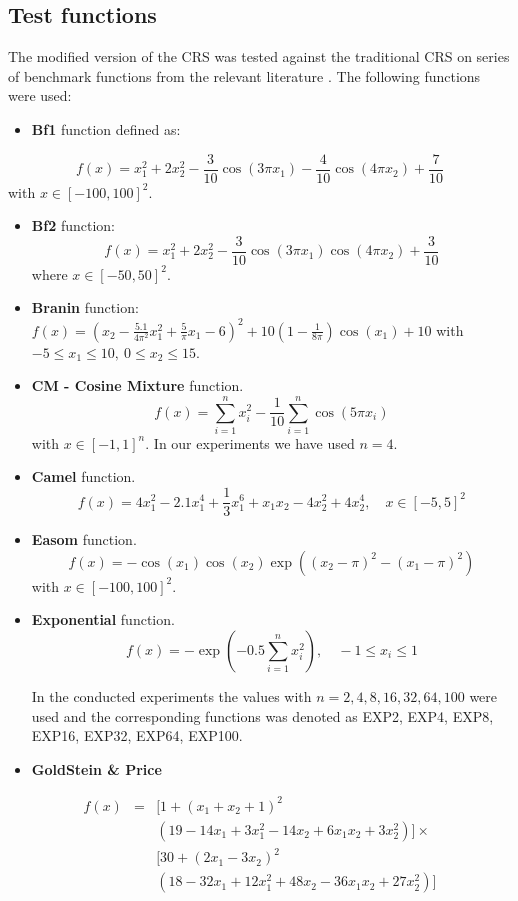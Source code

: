 \documentclass[symmetry,article,submit,moreauthors,pdftex]{mdpi}
\begin{document}
\subsection{Test functions }

The modified version of the CRS was tested against the traditional
CRS on series of benchmark functions from the relevant literature
\cite{Ali1,Floudas1}. The following functions were used: 
\begin{itemize}
\item \textbf{Bf1} function defined as:

\end{itemize}
\[
f(x)=x_{1}^{2}+2x_{2}^{2}-\frac{3}{10}\cos\left(3\pi x_{1}\right)-\frac{4}{10}\cos\left(4\pi x_{2}\right)+\frac{7}{10}
\]
with $x\in[-100,100]^{2}$. 
\begin{itemize}
\item \textbf{Bf2} function:
\[
f(x)=x_{1}^{2}+2x_{2}^{2}-\frac{3}{10}\cos\left(3\pi x_{1}\right)\cos\left(4\pi x_{2}\right)+\frac{3}{10}
\]
where $x\in[-50,50]^{2}$. 
\item \textbf{Branin} function:
$f(x)=\left(x_{2}-\frac{5.1}{4\pi^{2}}x_{1}^{2}+\frac{5}{\pi}x_{1}-6\right)^{2}+10\left(1-\frac{1}{8\pi}\right)\cos(x_{1})+10$
with $-5\le x_{1}\le10,\ 0\le x_{2}\le15$.
\item \textbf{CM - Cosine Mixture} function. 
\[
f(x)=\sum_{i=1}^{n}x_{i}^{2}-\frac{1}{10}\sum_{i=1}^{n}\cos\left(5\pi x_{i}\right)
\]
with $x\in[-1,1]^{n}$. In our experiments we have used $n=4$.
\item \textbf{Camel} function. 
\[
f(x)=4x_{1}^{2}-2.1x_{1}^{4}+\frac{1}{3}x_{1}^{6}+x_{1}x_{2}-4x_{2}^{2}+4x_{2}^{4},\quad x\in[-5,5]^{2}
\]
\item \textbf{Easom} function. 
\[
f(x)=-\cos\left(x_{1}\right)\cos\left(x_{2}\right)\exp\left(\left(x_{2}-\pi\right)^{2}-\left(x_{1}-\pi\right)^{2}\right)
\]
with $x\in[-100,100]^{2}.$ 
\item \textbf{Exponential} function. 
\[
f(x)=-\exp\left(-0.5\sum_{i=1}^{n}x_{i}^{2}\right),\quad-1\le x_{i}\le1
\]

In the conducted experiments the values with $n=2,4,8,16,32,64,100$ were used and the corresponding functions was denoted as EXP2, EXP4,
EXP8, EXP16, EXP32, EXP64, EXP100.
\item \textbf{GoldStein \& Price }
\end{itemize}
\begin{eqnarray*}
f(x) & = & [1+(x_{1}+x_{2}+1)^{2}\\
 &  & (19-14x_{1}+3x_{1}^{2}-14x_{2}+6x_{1}x_{2}+3x_{2}^{2})]\times\\
 &  & [30+(2x_{1}-3x_{2})^{2}\\
 &  & (18-32x_{1}+12x_{1}^{2}+48x_{2}-36x_{1}x_{2}+27x_{2}^{2})]
\end{eqnarray*}
\end{document}
